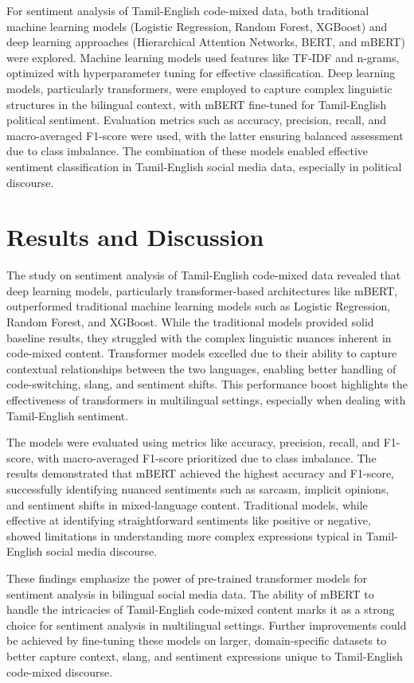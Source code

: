 \documentclass[11pt]{article}
\begin{document}
For sentiment analysis of Tamil-English code-mixed data, both traditional machine learning models (Logistic Regression, Random Forest, XGBoost) and deep learning approaches (Hierarchical Attention Networks, BERT, and mBERT) were explored. Machine learning models used features like TF-IDF and n-grams, optimized with hyperparameter tuning for effective classification. Deep learning models, particularly transformers, were employed to capture complex linguistic structures in the bilingual context, with mBERT fine-tuned for Tamil-English political sentiment. Evaluation metrics such as accuracy, precision, recall, and macro-averaged F1-score were used, with the latter ensuring balanced assessment due to class imbalance. The combination of these models enabled effective sentiment classification in Tamil-English social media data, especially in political discourse.


\section{Results and Discussion}

The study on sentiment analysis of Tamil-English code-mixed data revealed that deep learning models, particularly transformer-based architectures like mBERT, outperformed traditional machine learning models such as Logistic Regression, Random Forest, and XGBoost. While the traditional models provided solid baseline results, they struggled with the complex linguistic nuances inherent in code-mixed content. Transformer models excelled due to their ability to capture contextual relationships between the two languages, enabling better handling of code-switching, slang, and sentiment shifts. This performance boost highlights the effectiveness of transformers in multilingual settings, especially when dealing with Tamil-English sentiment.

The models were evaluated using metrics like accuracy, precision, recall, and F1-score, with macro-averaged F1-score prioritized due to class imbalance. The results demonstrated that mBERT achieved the highest accuracy and F1-score, successfully identifying nuanced sentiments such as sarcasm, implicit opinions, and sentiment shifts in mixed-language content. Traditional models, while effective at identifying straightforward sentiments like positive or negative, showed limitations in understanding more complex expressions typical in Tamil-English social media discourse.

These findings emphasize the power of pre-trained transformer models for sentiment analysis in bilingual social media data. The ability of mBERT to handle the intricacies of Tamil-English code-mixed content marks it as a strong choice for sentiment analysis in multilingual settings. Further improvements could be achieved by fine-tuning these models on larger, domain-specific datasets to better capture context, slang, and sentiment expressions unique to Tamil-English code-mixed discourse.
\end{document}
